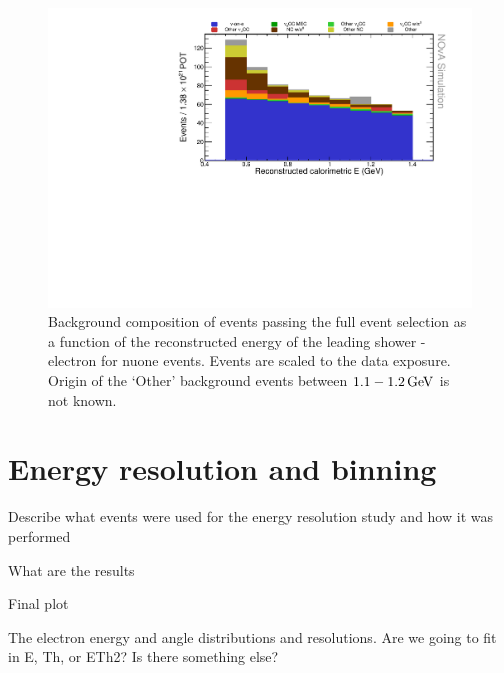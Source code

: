 \begin{figure}[hbtp]
\centering
\includegraphics[width=\textwidth]{Plots/NuMMEventSelection/N1Cut_calESignal.pdf}
\caption[Background composition of final selection]{Background composition of events passing the full event selection as a function of the reconstructed energy of the leading shower - electron for \acrshort{nuone} events. Events are scaled to the data exposure. Origin of the `Other' background events between $\unit[1.1-1.2]{GeV}$ is not known.}
\label{fig:NuMMBackgroundDecomposition}
\end{figure}


\iffalse
\section{Energy resolution and binning}\label{sec:NuMMResolution}
Describe what events were used for the energy resolution study and how it was performed

What are the results

Final plot

The electron energy and angle distributions and resolutions. Are we going to fit in E, Th, or ETh2? Is there something else?

